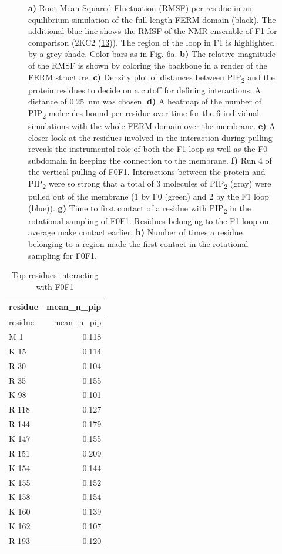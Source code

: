 \documentclass[
  twocolumn]{biophys-new-mod}
\begin{document}
\begin{figure}
\begin{minipage}[t]{0.50\linewidth}
\subcaption{\label{fig-f0f1-first-to-find}~}
\end{minipage}%

\caption{\label{fig-suppl}\textbf{a)} Root
Mean Squared Fluctuation (RMSF) per residue in an equilibrium simulation of
the full-length FERM domain (black). The additional blue line shows the RMSF of
the NMR ensemble of F1 for comparison (2KC2
(\protect\hyperlink{ref-goultStructureDoubleUbiquitinlike2010}{13})). The region of the loop in F1 is highlighted by a grey shade. Color bars as in Fig. 6a. 
\textbf{b)} The relative magnitude of the RMSF is shown by coloring the
backbone in a render of the FERM structure. \textbf{c)} Density plot
of distances between PIP\textsubscript{2} and the protein residues to
decide on a cutoff for defining interactions. A distance of 0.25~nm was
chosen. \textbf{d)} A heatmap of the number of PIP\textsubscript{2}
molecules bound per residue over time for the 6 individual simulations
with the whole FERM domain over the membrane. \textbf{e)} A closer look
at the residues involved in the interaction during pulling reveals the
instrumental role of both the F1 loop as well as the F0 subdomain in
keeping the connection to the membrane. \textbf{f)} Run 4 of the
vertical pulling of F0F1. Interactions between the protein and
PIP\textsubscript{2} were so strong that a total of 3 molecules of
PIP\textsubscript{2} (gray) were pulled out of the membrane (1 by F0
(green) and 2 by the F1 loop (blue)). \textbf{g)} Time to first contact
of a residue with PIP\textsubscript{2} in the rotational sampling of
F0F1. Residues belonging to the F1 loop on average make contact earlier.
\textbf{h)} Number of times a residue belonging to a region made the
first contact in the rotational sampling for F0F1.}

\end{figure}

\hypertarget{tbl-f0f1-top-interacting}{}
\begin{longtable}[]{@{}lr@{}}
\caption{\label{tbl-f0f1-top-interacting}Top residues interacting with
F0F1}\tabularnewline
\toprule()
residue & mean\_n\_pip \\
\midrule()
\endfirsthead
\toprule()
residue & mean\_n\_pip \\
\midrule()
\endhead
M 1 & 0.118 \\
K 15 & 0.114 \\
R 30 & 0.104 \\
R 35 & 0.155 \\
K 98 & 0.101 \\
R 118 & 0.127 \\
R 144 & 0.179 \\
K 147 & 0.155 \\
R 151 & 0.209 \\
K 154 & 0.144 \\
K 155 & 0.152 \\
K 158 & 0.154 \\
K 160 & 0.139 \\
K 162 & 0.107 \\
R 193 & 0.120 \\
\bottomrule()
\end{longtable}
\end{document}
